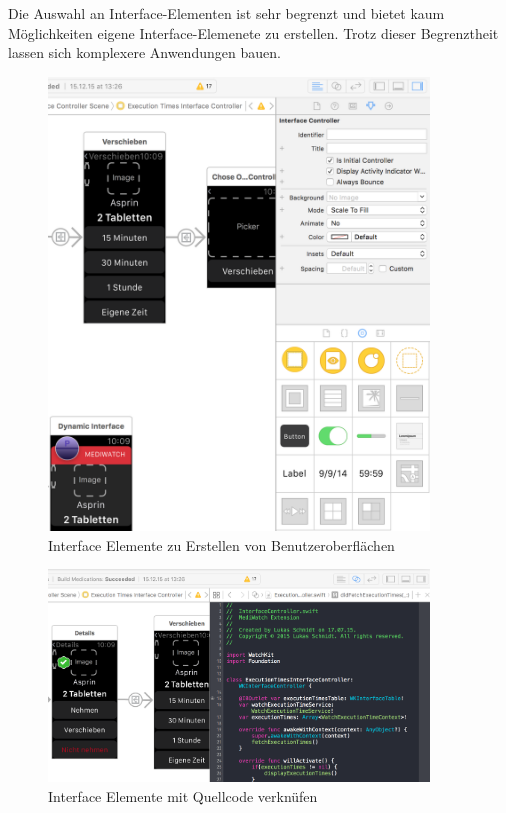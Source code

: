 Die Auswahl an Interface-Elementen ist sehr begrenzt und bietet kaum Möglichkeiten eigene Interface-Elemenete zu erstellen. Trotz dieser Begrenztheit lassen sich komplexere Anwendungen bauen.
\begin{figure}
	\caption{Interface Elemente zu Erstellen von Benutzeroberflächen}
	\label{fig:xcode-interface-elements}
	\centering
		\includegraphics[width=0.9\textwidth]{04_realisation/screenshots/xcode-interface-elements}
\end{figure}

\begin{figure}
	\caption{Interface Elemente mit Quellcode verknüfen}
	\label{fig:xcode-interface-code-connect}
	\centering
	\includegraphics[width=0.9\textwidth]{04_realisation/screenshots/xcode-interface-code-connect}
\end{figure}

